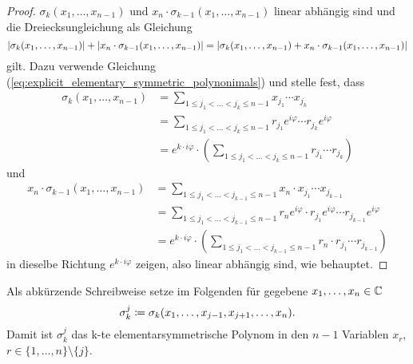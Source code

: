 \begin{proof}
    $\sigma_{k}(x_1, \dots, x_{n-1})$ und $x_n \cdot \sigma_{k-1}(x_1, \dots, x_{n-1})$
    linear abhängig sind und die Dreiecksungleichung als Gleichung
    \[
        \left\lvert \sigma_{k}(x_1, \dots, x_{n-1}) \right\rvert + \left\lvert x_n \cdot \sigma_{k-1}(x_1, \dots, x_{n-1}) \right\rvert
        = \left\lvert \sigma_{k}(x_1, \dots, x_{n-1}) + x_n \cdot \sigma_{k-1}(x_1, \dots, x_{n-1}) \right\rvert
    \]
    gilt.
    Dazu verwende Gleichung
    (\ref{eq:explicit_elementary_symmetric_polynonimals}) und stelle fest, dass
    \begin{equation*}
        \begin{split}
            \sigma_{k}(x_1, \dots, x_{n-1})
            &= \sum_{1 \leq j_1 < \dots < j_k \leq n-1} x_{j_1} \cdots x_{j_k}\\
            &= \sum_{1 \leq j_1 < \dots < j_k \leq n-1} r_{j_1} e^{i\varphi} \cdots r_{j_k} e^{i\varphi}\\
            &= e^{k\cdot i\varphi} \cdot \left( \sum_{1 \leq j_1 < \dots < j_k \leq n-1} r_{j_1} \cdots r_{j_k} \right)
        \end{split}
    \end{equation*}
    und
    \begin{equation*}
        \begin{split}
            x_n \cdot \sigma_{k-1}(x_1, \dots, x_{n-1})
            &= \sum_{1 \leq j_1 < \dots < j_{k-1} \leq n-1} x_n \cdot x_{j_1} \cdots x_{j_{k-1}}\\
            &= \sum_{1 \leq j_1 < \dots < j_{k-1} \leq n-1} r_n e^{i\varphi} \cdot r_{j_1} e^{i\varphi} \cdots r_{j_{k-1}} e^{i\varphi}\\
            &= e^{k\cdot i\varphi} \cdot \left( \sum_{1 \leq j_1 < \dots < j_{k-1} \leq n-1} r_n \cdot r_{j_1} \cdots r_{j_{k-1}} \right)
        \end{split}
    \end{equation*}
    in dieselbe Richtung $e^{k\cdot i\varphi}$ zeigen, also linear abhängig sind, wie behauptet.
\end{proof}

\begin{notation}
    Als abkürzende Schreibweise setze im Folgenden für gegebene $x_1, \dots, x_{n} \in \mathbb{C}$
    \[
        \sigma_{k}^{j} \coloneqq \sigma_{k}(x_1, \dots, x_{j-1}, x_{j+1}, \dots, x_{n}).
    \]
    Damit ist $\sigma_{k}^{j}$ das k-te elementarsymmetrische Polynom in den
    $n-1$ Variablen $x_r$, $r \in \{ 1, \dots, n \} \setminus \{ j \}$.
\end{notation}

